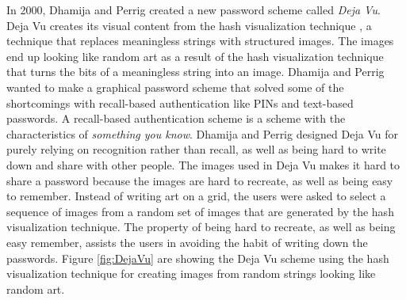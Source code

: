   In 2000, Dhamija and Perrig \cite{DejaVu} created a new password scheme called {\it Deja Vu}. Deja Vu creates its visual content from the hash visualization technique \cite{HashVisualization}, a technique that replaces meaningless strings with structured images. The images end up looking like random art as a result of the hash visualization technique that turns the bits of a meaningless string into an image. Dhamija and Perrig wanted to make a graphical password scheme that solved some of the shortcomings with recall-based authentication like PINs and text-based passwords. A recall-based authentication scheme is a scheme with the characteristics of {\it something you know}. Dhamija and Perrig designed Deja Vu for purely relying on recognition rather than recall, as well as being hard to write down and share with other people. The images used in Deja Vu makes it hard to share a password because the images are hard to recreate, as well as being easy to remember. Instead of writing art on a grid, the users were asked to select a sequence of images from a random set of images that are generated by the hash visualization technique. The property of being hard to recreate, as well as being easy remember, assists the users in avoiding the habit of writing down the passwords. Figure \ref{fig:DejaVu} are showing the Deja Vu scheme using the hash visualization technique for creating images from random strings looking like random art.


